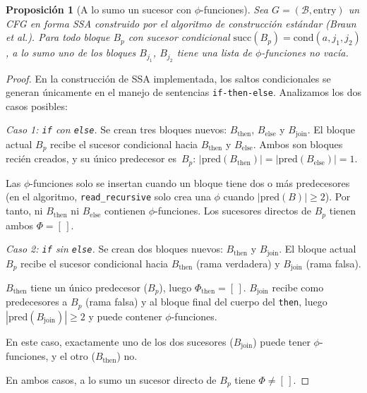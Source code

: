 \documentclass[12pt, a4paper]{article}
\newtheorem{proposition}{Proposición}[section]
\begin{document}
\begin{proposition}[A lo sumo un sucesor con $\phi$-funciones]
\label{prop:at-most-one-phi-succ}
Sea $G = (\mathcal{B}, \mathrm{entry})$ un CFG en forma SSA construido por el algoritmo
de construcción estándar (Braun et al.). Para todo bloque $B_p$ con sucesor condicional
$\mathrm{succ}(B_p) = \mathrm{cond}(a, j_1, j_2)$, a lo sumo uno de los bloques $B_{j_1}$,
$B_{j_2}$ tiene una lista de $\phi$-funciones no vacía.
\end{proposition}

\begin{proof}
En la construcción de SSA implementada, los saltos condicionales se generan únicamente en
el manejo de sentencias \texttt{if-then-else}. Analizamos los dos casos posibles:

\medskip
\emph{Caso 1: \texttt{if} con \texttt{else}.}
Se crean tres bloques nuevos: $B_{\mathrm{then}}$, $B_{\mathrm{else}}$ y $B_{\mathrm{join}}$.
El bloque actual $B_p$ recibe el sucesor condicional hacia $B_{\mathrm{then}}$ y $B_{\mathrm{else}}$.
Ambos son bloques recién creados, y su único predecesor es~$B_p$:
$|\mathrm{pred}(B_{\mathrm{then}})| = |\mathrm{pred}(B_{\mathrm{else}})| = 1$.

Las $\phi$-funciones solo se insertan cuando un bloque tiene dos o más predecesores
(en el algoritmo, \texttt{read\_recursive} solo crea una $\phi$ cuando
$|\mathrm{pred}(B)| \geq 2$). Por tanto, ni $B_{\mathrm{then}}$ ni $B_{\mathrm{else}}$
contienen $\phi$-funciones. Los sucesores directos de $B_p$ tienen ambos
$\Phi = [\,]$.

\medskip
\emph{Caso 2: \texttt{if} sin \texttt{else}.}
Se crean dos bloques nuevos: $B_{\mathrm{then}}$ y $B_{\mathrm{join}}$.
El bloque actual $B_p$ recibe el sucesor condicional hacia $B_{\mathrm{then}}$ (rama verdadera) y
$B_{\mathrm{join}}$ (rama falsa).

$B_{\mathrm{then}}$ tiene un único predecesor ($B_p$), luego $\Phi_{\mathrm{then}} = [\,]$.
$B_{\mathrm{join}}$ recibe como predecesores a $B_p$ (rama falsa) y al bloque final del cuerpo
del \texttt{then}, luego $|\mathrm{pred}(B_{\mathrm{join}})| \geq 2$ y puede contener
$\phi$-funciones.

En este caso, exactamente uno de los dos sucesores ($B_{\mathrm{join}}$) puede tener
$\phi$-funciones, y el otro ($B_{\mathrm{then}}$) no.

\medskip
En ambos casos, a lo sumo un sucesor directo de $B_p$ tiene $\Phi \neq [\,]$.
\end{proof}
\end{document}
